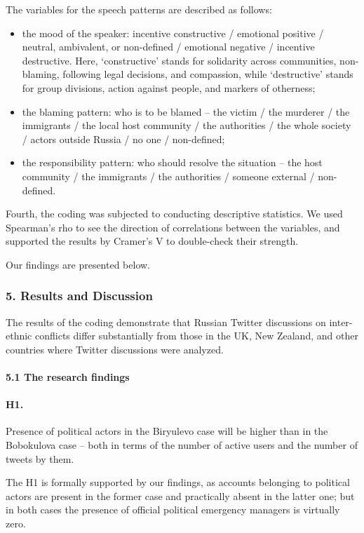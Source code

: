 The variables for the speech patterns are described as follows:

\begin{itemize}
	\item the mood of the speaker: incentive constructive / emotional positive / neutral, ambivalent, or non-defined / emotional negative / incentive destructive. Here, ‘constructive’ stands for solidarity across communities, non-blaming, following legal decisions, and compassion, while ‘destructive’ stands for group divisions, action against people, and markers of otherness;
	\item the blaming pattern: who is to be blamed -- the victim / the murderer / the immigrants / the local host community / the authorities / the whole society / actors outside Russia / no one / non-defined;
	\item the responsibility pattern: who should resolve the situation -- the host community / the immigrants / the authorities / someone external / non-defined.
\end{itemize}

Fourth, the coding was subjected to conducting descriptive statistics. We used Spearman’s rho to see the direction of correlations between the variables, and supported the results by Cramer’s V to double-check their strength.

Our findings are presented below.

\subsubsection{5. Results and Discussion}

The results of the coding demonstrate that Russian Twitter discussions on inter-ethnic conflicts differ substantially from those in the UK, New Zealand, and other countries where Twitter discussions were analyzed.

\paragraph{5.1 The research findings}
\paragraph{H1.} Presence of political actors in the Biryulevo case will be higher than in the Bobokulova case -- both in terms of the number of active users and the number of tweets by them.

The H1 is formally supported by our findings, as accounts belonging to political actors are present in the former case and practically absent in the latter one; but in both cases the presence of official political emergency managers is virtually zero.

